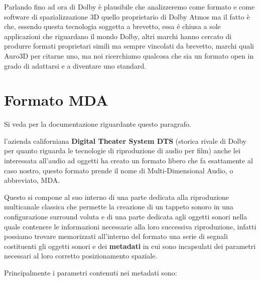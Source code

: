 \documentclass[12pt,a4paper]{report}
\begin{document}
Parlando fino ad ora di Dolby è plausibile che analizzeremo come formato e come software di spazializzazione 3D quello proprietario di Dolby Atmos ma il fatto è che, essendo questa tecnologia soggetta a brevetto, essa é chiusa a sole applicazioni che riguardano il mondo Dolby, altri marchi hanno cercato di produrre formati proprietari simili ma sempre vincolati da brevetto, marchi quali Auro3D per citarne uno, ma noi ricerchiamo qualcosa che sia un formato open in grado di adattarsi e a diventare uno standard. 

\section{Formato MDA}

Si veda \cite{mda} per la documentazione riguardante questo paragrafo.

l'azienda californiana \textbf{Digital Theater System DTS} (storica rivale di Dolby per quanto riguarda le tecnologie di riproduzione di audio per film) anche lei interessata all'audio ad oggetti ha creato un formato libero che fa esattamente al caso nostro, questo formato prende il nome di Multi-Dimensional Audio, o abbreviato, MDA.

Questo si compone al suo interno di una parte dedicata alla riproduzione multicanale classica che permette la creazione di un tappeto sonoro in una configurazione surround voluta e di una parte dedicata agli oggetti sonori nella quale contenere le informazioni necessarie alla loro successiva riproduzione, infatti possiamo trovare memorizzati all'interno del formato una serie di segnali costituenti gli oggetti sonori e dei \textbf{metadati} in cui sono incapsulati dei parametri necessari al loro corretto posizionamento spaziale.

Principalmente i parametri contenuti nei metadati sono:
\end{document}
